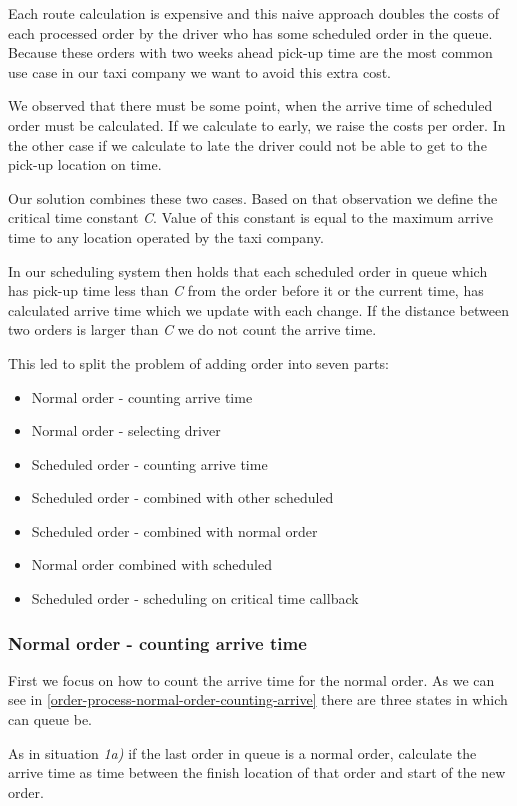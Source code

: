 Each route calculation is expensive and this naive approach doubles the costs of each processed order by the driver who has some scheduled order in the queue. Because these orders with two weeks ahead pick-up time are the most common use case in our taxi company we want to avoid this extra cost. 

We observed that there must be some point, when the arrive time of scheduled order must be calculated. If we calculate to early, we raise the costs per order. In the other case if we calculate to late the driver could not be able to get to the pick-up location on time. 

Our solution combines these two cases. Based on that observation we define the critical time constant \textit{C}. Value of this constant is equal to the maximum arrive time to any location operated by the taxi company. 

In our scheduling system then holds that each scheduled order in queue which has pick-up time less than \textit{C} from the order before it or the current time, has calculated arrive time which we update with each change. If the distance between two orders is larger than \textit{C} we do not count the arrive time.

This led to split the problem of adding order into seven parts:
\begin{itemize}
	\item Normal order - counting arrive time
	\item Normal order - selecting driver
	\item Scheduled order - counting arrive time
	\item Scheduled order - combined with other scheduled
	\item Scheduled order - combined with normal order
	\item Normal order combined with scheduled
	\item Scheduled order - scheduling on critical time callback 
\end{itemize}

	\subsubsection{Normal order - counting arrive time}
	
	First we focus on how to count the arrive time for the normal order. As we can see in \ref{order-process-normal-order-counting-arrive} there are three states in which can queue be.
	
	As in situation \textit{1a)} if the last order in queue is a normal order, calculate the arrive time as time between the finish location of that order and start of the new order.
	
